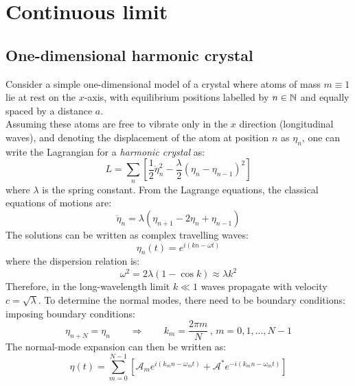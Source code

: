 
\section{Continuous limit}

\subsection{One-dimensional harmonic crystal}

Consider a simple one-dimensional model of a crystal where atoms of mass $ m \equiv 1 $ lie at rest on the $ x $-axis, with equilibrium positions labelled by $ n \in \mathbb{N} $ and equally spaced by a distance $ a $.\\
Assuming these atoms are free to vibrate only in the $ x $ direction (longitudinal waves), and denoting the displacement of the atom at position $ n $ as $ \eta_n $, one can write the Lagrangian for a \textit{harmonic crystal} as:
\begin{equation}
  L = \sum_{n} \left[ \frac{1}{2} \dot{\eta}_n^2 - \frac{\lambda}{2} \left( \eta_n - \eta_{n-1} \right)^2 \right]
  \label{eq:first-lag}
\end{equation}
where $ \lambda $ is the spring constant. From the Lagrange equations, the classical equations of motions are:
\begin{equation}
  \ddot{\eta}_n = \lambda \left( \eta_{n+1} - 2 \eta_n + \eta_{n-1} \right)
\end{equation}
The solutions can be written as complex travelling waves:
\begin{equation}
  \eta_n (t) = e^{i \left( k n - \omega t \right)}
\end{equation}
where the dispersion relation is:
\begin{equation}
  \omega^2 = 2\lambda \left( 1 - \cos k \right) \approx \lambda k^2
\end{equation}
Therefore, in the long-wavelength limit $ k \ll 1 $ waves propagate with velocity $ c = \sqrt{\lambda} $. To determine the normal modes, there need to be boundary conditions: imposing boundary conditions:
\begin{equation}
  \eta_{n + N} = \eta_n \qquad \Rightarrow \qquad k_m = \frac{2\pi m}{N} \,,\, m = 0, 1, \dots, N - 1
\end{equation}
The normal-mode expansion can then be written as:
\begin{equation}
  \eta (t) = \sum_{m = 0}^{N - 1} \left[ \mathcal{A}_m e^{i \left( k_m n - \omega_m t \right)} + \mathcal{A}^* e^{-i \left( k_m n - \omega_m t \right)} \right]
  \label{eq:first-exp}
\end{equation}
